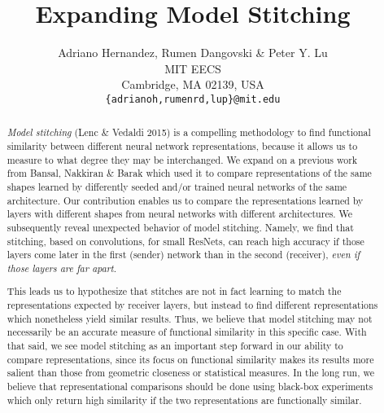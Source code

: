 \documentclass{article} %
\title{Expanding Model Stitching}
\author{Adriano Hernandez, Rumen Dangovski \& Peter Y. Lu\\
MIT EECS\\
Cambridge, MA 02139, USA \\
\texttt{\{adrianoh,rumenrd,lup\}@mit.edu}
}
\begin{document}
\maketitle

\begin{abstract}
\textit{Model stitching} (Lenc \& Vedaldi 2015) is a compelling methodology to find functional
similarity between different neural network representations, because it allows us to measure to
what degree they may be interchanged.
We expand on a previous work from Bansal, Nakkiran \& Barak which used it to
compare representations of the same shapes learned by differently seeded
and/or trained neural networks of the same architecture.
Our contribution enables us to compare the representations learned by layers with
different shapes from neural networks with different architectures.
We subsequently reveal unexpected behavior of model stitching. Namely, we find that stitching, 
based on convolutions, for small ResNets, can reach
high accuracy if those layers come later in the first (sender) network than in
the second (receiver), \textit{even if those layers are far apart}. 

This leads us to hypothesize that stitches are not in fact learning to match the
representations expected by receiver layers, but instead to find different representations which nonetheless
yield similar results. Thus, we believe that model stitching may not necessarily be an
accurate measure of functional similarity in this specific case.
With that said, we see model stitching as an important
step forward in our ability to compare representations, since its focus on
functional similarity makes its results more salient than those from
geometric closeness or statistical measures.
In the long run, we believe that representational comparisons should
be done using black-box 
experiments which only return high similarity if the two representations are
functionally similar.
\end{abstract}
\end{document}
